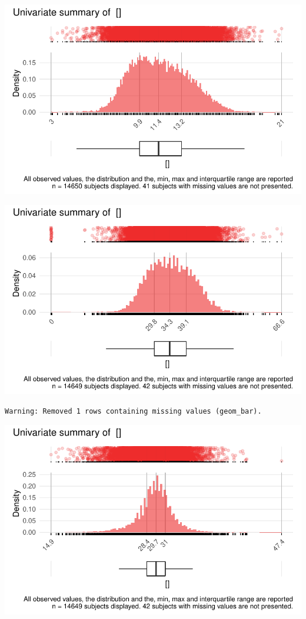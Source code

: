 \documentclass[
  letterpaper,
  DIV=11,
  numbers=noendperiod]{scrreport}
\begin{document}
\includegraphics{./Bact_univar_files/figure-pdf/uni04-2.pdf}

\includegraphics{./Bact_univar_files/figure-pdf/uni04-3.pdf}

\begin{verbatim}
Warning: Removed 1 rows containing missing values (geom_bar).
\end{verbatim}

\includegraphics{./Bact_univar_files/figure-pdf/uni04-4.pdf}
\end{document}
